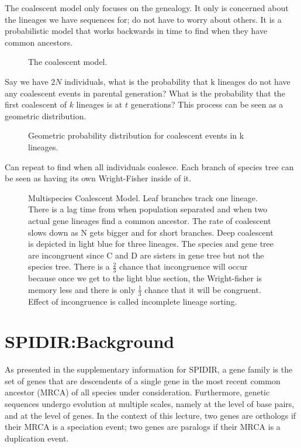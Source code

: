 The coalescent model only focuses on the genealogy. It only is
concerned about the lineages we have sequences for; do not have to
worry about others. It is a probabilistic model that works backwards
in time to find when they have common ancestors.

\begin{figure} [ht!] 
  \centering 
  \caption{The coalescent model.}
  \label{Fig15_CoalescentModel}
\end{figure} 

Say we have $2N$ individuals, what is the probability that k lineages
do not have any coalescent events in parental generation? What is the
probability that the first coalescent of $k$ lineages is at $t$
generations? This process can be seen as a geometric distribution.

\begin{figure} [ht!] 
  \centering 
  \caption{Geometric probability distribution for coalescent events in k lineages.}
  \label{Fig16_CoalescentProbDist}
\end{figure} 

\noindent Can repeat to find when all individuals coalesce. Each
branch of species tree can be seen as having its own Wright-Fisher
inside of it.

\begin{figure} [ht!] 
  \centering 
  \caption{Multispecies Coalescent Model. Leaf branches track one
    lineage. There is a lag time from when population separated and
    when two actual gene lineages find a common ancestor. The rate of
    coalescent slows down as N gets bigger and for short
    branches. Deep coalescent is depicted in light blue for three
    lineages. The species and gene tree are incongruent since C and D
    are sisters in gene tree but not the species tree. There is a
    $\frac{2}{3}$ chance that incongruence will occur because once we
    get to the light blue section, the Wright-fisher is memory less
    and there is only $\frac{1}{3}$ chance that it will be
    congruent. Effect of incongruence is called incomplete lineage
    sorting.}
  \label{Fig17_MultispeciesCoalescent}
\end{figure} 

\section{SPIDIR:Background} 
As presented in the supplementary information for SPIDIR, a gene
family is the set of genes that are descendents of a single gene in
the most recent common ancestor (MRCA) of all species under
consideration. Furthermore, genetic sequences undergo evolution at
multiple scales, namely at the level of base pairs, and at the level
of genes. In the context of this lecture, two genes are orthologs if
their MRCA is a speciation event; two genes are paralogs if their MRCA
is a duplication event.

